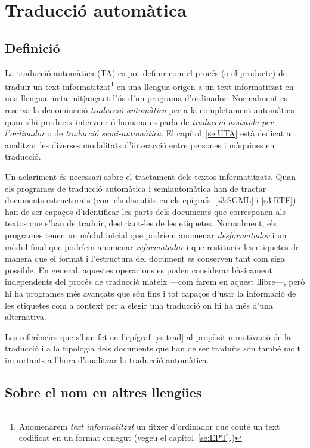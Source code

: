 \section{Traducció automàtica}

\subsection{Definició}

La traducció automàtica (TA) es pot definir com el procés (o el
producte) de traduir un text informatitzat\footnote{Anomenarem {\em
    text informatitzat} un fitxer  d'ordinador que conté un
  text codificat en un format conegut (vegeu el capítol~\ref{se:EPT}.)
  } en una llengua origen a un text informatitzat en una llengua meta
mitjançant l'ús d'un programa d'ordinador. Normalment es reserva
la denominació \emph{traducció automàtica} per a la completament
automàtica; quan s'hi produeix intervenció humana es parla de {\em
  traducció assistida per l'ordinador} o de \emph{traducció
  semi-automàtica}.  El capítol~\ref{se:UTA} està dedicat a analitzar
les diverses modalitats d'interacció entre persones i màquines en
traducció.

Un aclariment és necessari sobre el tractament dels textos
informatitzats. Quan els programes de traducció automàtica i
semiautomàtica han de tractar documents estructurats (com els
discutits en els epígrafs~\ref{s3:SGML} i \ref{s3:RTF}) han de ser
capaços d'identificar les parts dels documents que corresponen als
textos que s'han de traduir, destriant-les de les etiquetes.
Normalment, els programes tenen un mòdul inicial que podríem anomenar
\emph{desformatador} i un mòdul final que podríem anomenar
\emph{reformatador} i que restitueix les etiquetes de manera que el
format i l'estructura del document es conserven tant com siga
possible. En general, aquestes operacions es poden considerar
bàsicament independents del procés de traducció mateix ---com farem en
aquest llibre---, però hi ha programes més avançats que són fins i tot
capaços d'usar la informació de les etiquetes com a context per a
elegir una traducció on hi ha més d'una alternativa.

 Les referències que s'han fet en l'epígraf~\ref{ss:trad} al propòsit o
motivació de la traducció i a la tipologia dels documents que han de
ser traduïts són també molt importants a l'hora d'analitzar la
traducció automàtica.


\subsection{Sobre el nom en altres llengües}

